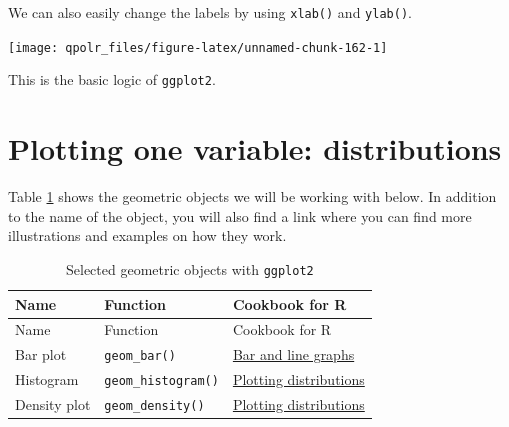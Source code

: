 \documentclass[12pt,oneside]{reedthesis}
\theoremstyle{definition}
\theoremstyle{definition}
\theoremstyle{definition}
\theoremstyle{remark}
\begin{document}
  We can also easily change the labels by using \texttt{xlab()} and
  \texttt{ylab()}.
  \begin{Shaded}
  \begin{Highlighting}[]
  \NormalTok{(}\OperatorTok{+}
  \StringTok{  }\NormalTok{() }\OperatorTok{+}
  \StringTok{  }\NormalTok{() }\OperatorTok{+}
  \StringTok{  }\NormalTok{(}\NormalTok{) }\OperatorTok{+}
  \StringTok{  }\NormalTok{(}\NormalTok{)}
  \end{Highlighting}
  \end{Shaded}
  \begin{center}\texttt{[image: qpolr\_files/figure-latex/unnamed-chunk-162-1]} \end{center}
  
  This is the basic logic of \texttt{ggplot2}.
  
  \section{Plotting one variable:
  distributions}\label{plotting-one-variable-distributions}
  
  Table \ref{tab:distributions} shows the geometric objects we will be
  working with below. In addition to the name of the object, you will also
  find a link where you can find more illustrations and examples on how
  they work.
  \begin{longtable}[]{@{}lll@{}}
  \caption{\label{tab:distributions} Selected geometric objects with
  \texttt{ggplot2}}\tabularnewline
  \toprule
  Name & Function & Cookbook for R\tabularnewline
  \midrule
  \endfirsthead
  \toprule
  Name & Function & Cookbook for R\tabularnewline
  \midrule
  \endhead
  Bar plot & \texttt{geom\_bar()} &
  \href{http://www.cookbook-r.com/Graphs/Bar_and_line_graphs_(ggplot2)/}{Bar
  and line graphs}\tabularnewline
  Histogram & \texttt{geom\_histogram()} &
  \href{http://www.cookbook-r.com/Graphs/Plotting_distributions_(ggplot2)/}{Plotting
  distributions}\tabularnewline
  Density plot & \texttt{geom\_density()} &
  \href{http://www.cookbook-r.com/Graphs/Plotting_distributions_(ggplot2)/}{Plotting
  distributions}\tabularnewline
  \bottomrule
  \end{longtable}
\end{document}
